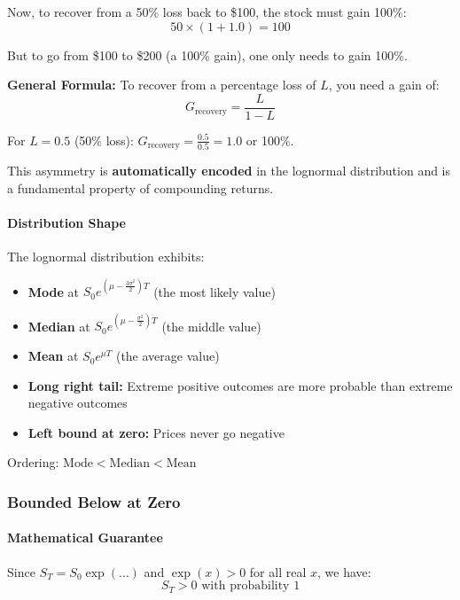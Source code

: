 \documentclass[12pt,a4paper]{article}
\begin{document}
Now, to recover from a 50\% loss back to \$100, the stock must gain 100\%:
\begin{equation}
50 \times (1 + 1.0) = 100
\end{equation}

But to go from \$100 to \$200 (a 100\% gain), one only needs to gain 100\%.

\textbf{General Formula:} To recover from a percentage loss of $L$, you need a gain of:
\begin{equation}
G_{\text{recovery}} = \frac{L}{1-L}
\end{equation}

For $L = 0.5$ (50\% loss): $G_{\text{recovery}} = \frac{0.5}{0.5} = 1.0$ or 100\%.

This asymmetry is \textbf{automatically encoded} in the lognormal distribution and is a fundamental property of compounding returns.

\paragraph{Distribution Shape}

The lognormal distribution exhibits:
\begin{itemize}
    \item \textbf{Mode} at $S_0 e^{(\mu - \frac{3\sigma^2}{2})T}$ (the most likely value)
    \item \textbf{Median} at $S_0 e^{(\mu - \frac{\sigma^2}{2})T}$ (the middle value)
    \item \textbf{Mean} at $S_0 e^{\mu T}$ (the average value)
    \item \textbf{Long right tail:} Extreme positive outcomes are more probable than extreme negative outcomes
    \item \textbf{Left bound at zero:} Prices never go negative
\end{itemize}

Ordering: $\text{Mode} < \text{Median} < \text{Mean}$

\subsubsection{Bounded Below at Zero}

\paragraph{Mathematical Guarantee}

Since $S_T = S_0 \exp(\ldots)$ and $\exp(x) > 0$ for all real $x$, we have:
\begin{equation}
S_T > 0 \text{ with probability 1}
\end{equation}
\end{document}

